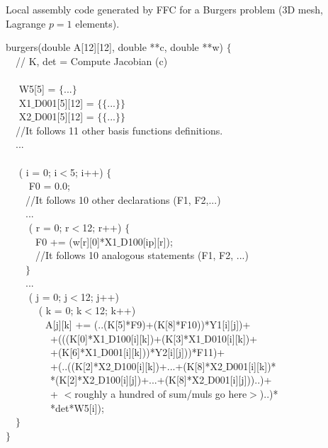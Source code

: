 \documentclass[conference]{IEEEtran}
\begin{document}
\begin{algorithm}[t]
\small
\caption{Local assembly code generated by FFC for a Burgers problem (3D mesh, Lagrange $p=1$ elements).}
\label{code:burgers}
 burgers(double A[12][12], double **c, double **w) $\lbrace$\\
~~// K, det = Compute Jacobian (c) \\
~~\\
~~ W5[5] = $\lbrace$...$\rbrace$\\
~~ X1$\_$D001[5][12] = $\lbrace\lbrace$...$\rbrace\rbrace$\\
~~ X2$\_$D001[5][12] = $\lbrace\lbrace$...$\rbrace\rbrace$\\
~~//It follows 11 other basis functions definitions.\\
~~...\\
~~\\
~~ ( i = 0; i$<$5; i++) $\lbrace$\\
~~~~ F0 = 0.0;\\
~~~~//It follows 10 other declarations (F1, F2,...)\\
~~~~...\\
~~~~ ( r = 0; r$<$12; r++) $\lbrace$\\
~~~~~~F0 += (w[r][0]*X1$\_$D100[ip][r]);\\
~~~~~~//It follows 10 analogous statements (F1, F2, ...)\\
~~~~$\rbrace$\\
~~~~...\\
~~~~ ( j = 0; j$<$12; j++) \\
~~~~~~ ( k = 0; k$<$12; k++) \\
~~~~~~~~A[j][k] += (..(K[5]*F9)+(K[8]*F10))*Y1[i][j])+\\
~~~~~~~~~+(((K[0]*X1$\_$D100[i][k])+(K[3]*X1$\_$D010[i][k])+\\
~~~~~~~~~+(K[6]*X1$\_$D001[i][k]))*Y2[i][j]))*F11)+\\
~~~~~~~~~+(..((K[2]*X2$\_$D100[i][k])+...+(K[8]*X2$\_$D001[i][k])*\\
~~~~~~~~~*(K[2]*X2$\_$D100[i][j])+...+(K[8]*X2$\_$D001[i][j]))..)+\\
~~~~~~~~~+ $<$roughly a hundred of sum/muls go here$>$)..)*\\
~~~~~~~~~*det*W5[i]);\\
~~$\rbrace$ \\
$\rbrace$
\end{algorithm}
\end{document}
